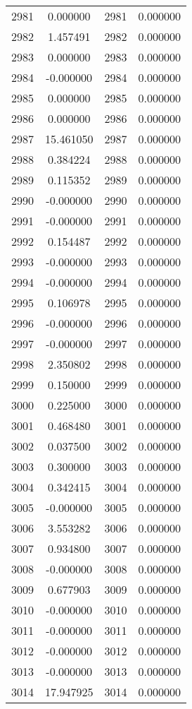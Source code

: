 \documentclass[12pt]{article}
\begin{document}
\begin{longtable}{@{}cccc@{}}
2981 & 0.000000 & 2981 & 0.000000 \\
2982 & 1.457491 & 2982 & 0.000000 \\
2983 & 0.000000 & 2983 & 0.000000 \\
2984 & -0.000000 & 2984 & 0.000000 \\
2985 & 0.000000 & 2985 & 0.000000 \\
2986 & 0.000000 & 2986 & 0.000000 \\
2987 & 15.461050 & 2987 & 0.000000 \\
2988 & 0.384224 & 2988 & 0.000000 \\
2989 & 0.115352 & 2989 & 0.000000 \\
2990 & -0.000000 & 2990 & 0.000000 \\
2991 & -0.000000 & 2991 & 0.000000 \\
2992 & 0.154487 & 2992 & 0.000000 \\
2993 & -0.000000 & 2993 & 0.000000 \\
2994 & -0.000000 & 2994 & 0.000000 \\
2995 & 0.106978 & 2995 & 0.000000 \\
2996 & -0.000000 & 2996 & 0.000000 \\
2997 & -0.000000 & 2997 & 0.000000 \\
2998 & 2.350802 & 2998 & 0.000000 \\
2999 & 0.150000 & 2999 & 0.000000 \\
3000 & 0.225000 & 3000 & 0.000000 \\
3001 & 0.468480 & 3001 & 0.000000 \\
3002 & 0.037500 & 3002 & 0.000000 \\
3003 & 0.300000 & 3003 & 0.000000 \\
3004 & 0.342415 & 3004 & 0.000000 \\
3005 & -0.000000 & 3005 & 0.000000 \\
3006 & 3.553282 & 3006 & 0.000000 \\
3007 & 0.934800 & 3007 & 0.000000 \\
3008 & -0.000000 & 3008 & 0.000000 \\
3009 & 0.677903 & 3009 & 0.000000 \\
3010 & -0.000000 & 3010 & 0.000000 \\
3011 & -0.000000 & 3011 & 0.000000 \\
3012 & -0.000000 & 3012 & 0.000000 \\
3013 & -0.000000 & 3013 & 0.000000 \\
3014 & 17.947925 & 3014 & 0.000000 \\

\end{longtable}
\end{document}
